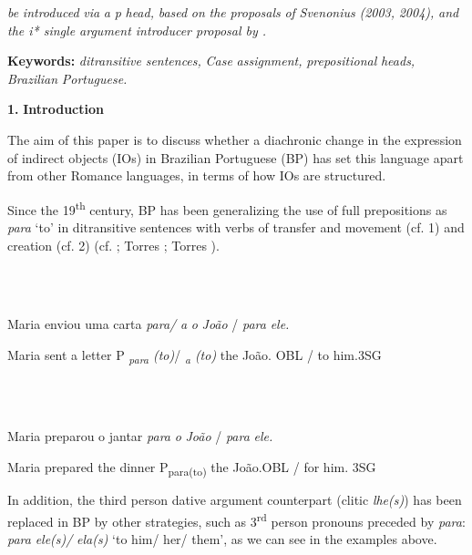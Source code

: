 \documentclass[output=paper,modfonts,nonflat]{langsci/langscibook}
\begin{document}
\textit{be} \textit{introduced} \textit{via} \textit{a} \textit{p} \textit{head,} \textit{based} \textit{on} \textit{the} \textit{proposals} \textit{of} \textit{Svenonius} \textit{(2003,} \textit{2004),} \textit{\citet{Wood2012} and the i* single argument introducer proposal by \citet{WoodMarantz2017}.}

\textbf{Keywords:} \textit{ditransitive} \textit{sentences,} \textit{Case} \textit{assignment,} \textit{prepositional} \textit{heads,} \textit{Brazilian} \textit{Portuguese.}

\textbf{1.} \textbf{Introduction} 

The aim of this paper is to discuss whether a diachronic change in the expression of indirect objects (IOs) in Brazilian Portuguese (BP) has set this language apart from other Romance languages, in terms of how IOs are structured.

Since the 19\textsuperscript{th} century, BP has been generalizing the use of full prepositions as \textit{para} ‘to’ in ditransitive sentences with verbs of transfer and movement (cf. 1) and creation (cf. 2) (cf. \citealt{Freire2005}; Torres \citealt{MoraisBerlinck2006}; Torres \citealt{MoraisSalles2010}).

\begin{styleBodyTextii}
\ea%
    \label{ex:key:1}
    \gll\\
        \\
    \glt
    \z

         Maria enviou  uma carta  \textit{para/} \textit{a}           \textit{o} \textit{João}               / \textit{para} \textit{ele.}    
\end{styleBodyTextii}

\begin{styleBodyTextii}
     Maria sent       a letter      P \textit{\textsubscript{para} \textit{(to)}}/ \textit{\textsubscript{a} \textit{(to)}}   the João. OBL  / to him.3SG  
\end{styleBodyTextii}

\ea%
    \label{ex:key:2}
    \gll\\
        \\
    \glt
    \z

         Maria     preparou  o jantar        \textit{para}    \textit{o} \textit{João}  / \textit{para} \textit{ele.}        

      Maria     prepared  the dinner    P\textsubscript{para(to)} the João.OBL / for him. 3SG 

In addition, the third person dative argument counterpart (clitic \textit{lhe(s)}) has been replaced in BP by other strategies, such as 3\textsuperscript{rd} person pronouns preceded by \textit{para}:  \textit{para} \textit{ele(s)/} \textit{ela(s)} ‘to him/ her/ them’, as we can see in the examples above.
\end{document}
